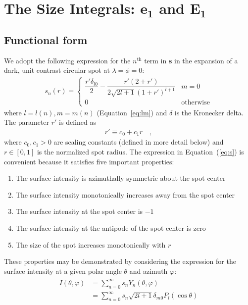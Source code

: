 \documentclass[modern]{aastex62}
\begin{document}
%
\section{The Size Integrals: \lowercase{$\mathbf{e_1}$} and $\mathbf{E_1}$}
\label{sec:size}
%
\subsection{Functional form}
\label{sec:size-function}
%
We adopt the following expression for the $n^{\mathrm{th}}$ term in $\mathbf{s}$
in the expansion of a dark, unit contrast circular spot at
$\lambda = \phi = 0$:
%
\begin{align}
    \label{eq:s}
    s_{n}(r) =
    \begin{cases}
        \dfrac{r' \delta_{l0}}{2}
        -\dfrac{r' \left( 2 + r' \right)}
        {2 \sqrt{2l + 1} (1 + r')^{l + 1}}
         & m = 0
        \\
        0
         & \mathrm{otherwise}
    \end{cases}
\end{align}
%
where
$l = l(n), m = m(n)$ (Equation~\ref{eq:lm}) and
$\delta$ is the Kronecker delta. The parameter $r'$ is defined as
%
\begin{align}
    \label{eq:rprime}
    r' \equiv c_0 + c_1 r
    \quad,
\end{align}
%
where $c_0, c_1 > 0$ are scaling constants (defined in more detail below)
and $r \in [0, 1]$ is the normalized spot radius.
The expression in Equation~(\ref{eq:s}) is convenient because it satisfies
five important properties:
%
\begin{enumerate}[itemsep=2pt,parsep=1pt,label=\textbf{\arabic*}]
    \item The surface intensity is azimuthally symmetric about the spot center
    \item The surface intensity monotonically increases away from the spot center
    \item The surface intensity at the spot center is $-1$
    \item The surface intensity at the antipode of the spot center is zero
    \item The size of the spot increases monotonically with $r$
\end{enumerate}
%
These properties may be demonstrated by considering the
expression for the surface intensity at a given polar angle $\theta$ and
azimuth $\varphi$:
%
\begin{align}
    \begin{split}
        I(\theta, \varphi)
        & =
        \sum\limits_{n=0}^\infty
        s_{n} Y_{n}(\theta, \varphi) \\
        & =
        \sum\limits_{n=0}^\infty
        s_{n} \sqrt{2l + 1} \delta_{m0} P_l(\cos\theta)
    \end{split}
\end{align}
\end{document}
